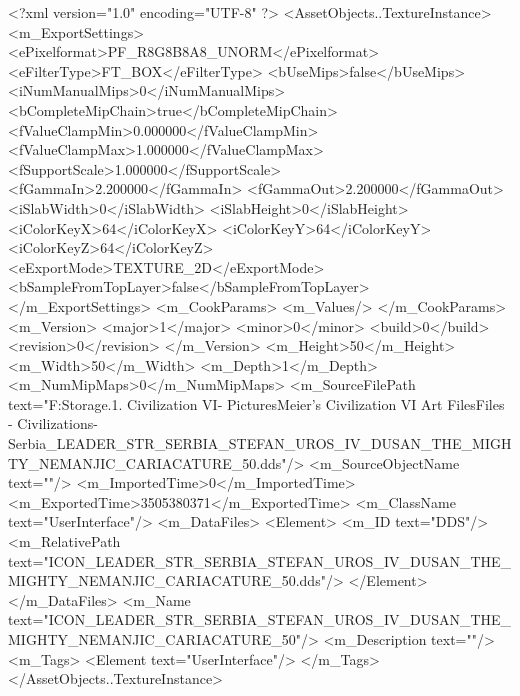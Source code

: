 <?xml version="1.0" encoding="UTF-8" ?>
<AssetObjects..TextureInstance>
	<m_ExportSettings>
		<ePixelformat>PF_R8G8B8A8_UNORM</ePixelformat>
		<eFilterType>FT_BOX</eFilterType>
		<bUseMips>false</bUseMips>
		<iNumManualMips>0</iNumManualMips>
		<bCompleteMipChain>true</bCompleteMipChain>
		<fValueClampMin>0.000000</fValueClampMin>
		<fValueClampMax>1.000000</fValueClampMax>
		<fSupportScale>1.000000</fSupportScale>
		<fGammaIn>2.200000</fGammaIn>
		<fGammaOut>2.200000</fGammaOut>
		<iSlabWidth>0</iSlabWidth>
		<iSlabHeight>0</iSlabHeight>
		<iColorKeyX>64</iColorKeyX>
		<iColorKeyY>64</iColorKeyY>
		<iColorKeyZ>64</iColorKeyZ>
		<eExportMode>TEXTURE_2D</eExportMode>
		<bSampleFromTopLayer>false</bSampleFromTopLayer>
	</m_ExportSettings>
	<m_CookParams>
		<m_Values/>
	</m_CookParams>
	<m_Version>
		<major>1</major>
		<minor>0</minor>
		<build>0</build>
		<revision>0</revision>
	</m_Version>
	<m_Height>50</m_Height>
	<m_Width>50</m_Width>
	<m_Depth>1</m_Depth>
	<m_NumMipMaps>0</m_NumMipMaps>
	<m_SourceFilePath text="F:\Mod Storage\2.1. Civilization VI\Mods\Archive - Pictures\Sid Meier's Civilization VI Art Files\Art Files - Civilizations\Civilization - Serbia\ICON_LEADER_STR_SERBIA_STEFAN_UROS_IV_DUSAN_THE_MIGHTY_NEMANJIC_CARIACATURE_50.dds"/>
	<m_SourceObjectName text=""/>
	<m_ImportedTime>0</m_ImportedTime>
	<m_ExportedTime>3505380371</m_ExportedTime>
	<m_ClassName text="UserInterface"/>
	<m_DataFiles>
		<Element>
			<m_ID text="DDS"/>
			<m_RelativePath text="ICON_LEADER_STR_SERBIA_STEFAN_UROS_IV_DUSAN_THE_MIGHTY_NEMANJIC_CARIACATURE_50.dds"/>
		</Element>
	</m_DataFiles>
	<m_Name text="ICON_LEADER_STR_SERBIA_STEFAN_UROS_IV_DUSAN_THE_MIGHTY_NEMANJIC_CARIACATURE_50"/>
	<m_Description text=""/>
	<m_Tags>
		<Element text="UserInterface"/>
	</m_Tags>
</AssetObjects..TextureInstance>

